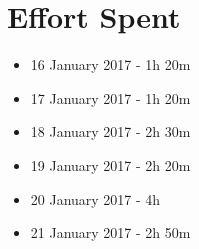 \section{Effort Spent}

\begin{itemize}
	\item 16 January 2017 - 1h 20m
	\item 17 January 2017 - 1h 20m
	\item 18 January 2017 - 2h 30m
	\item 19 January 2017 - 2h 20m
	\item 20 January 2017 - 4h
	\item 21 January 2017 - 2h 50m
\end{itemize}
